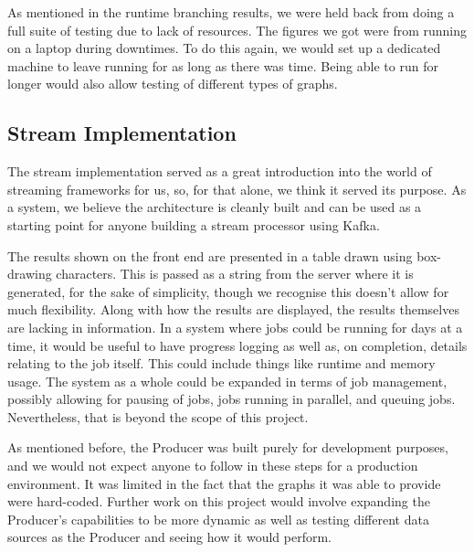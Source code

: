 As mentioned in the runtime branching results, we were held back from doing a
full suite of testing due to lack of resources. The figures we got were from
running on a laptop during downtimes. To do this again, we would set up a
dedicated machine to leave running for as long as there was time. Being able to
run for longer would also allow testing of different types of graphs.

\subsection{Stream Implementation}

The stream implementation served as a great introduction into the world of
streaming frameworks for us, so, for that alone, we think it served its
purpose. As a system, we believe the architecture is cleanly built and can be
used as a starting point for anyone building a stream processor using Kafka.

The results shown on the front end are presented in a table drawn using
box-drawing characters. This is passed as a string from the server where it is
generated, for the sake of simplicity, though we recognise this doesn't allow
for much flexibility. Along with how the results are displayed, the results
themselves are lacking in information. In a system where jobs could be running
for days at a time, it would be useful to have progress logging as well as, on
completion, details relating to the job itself. This could include things like
runtime and memory usage. The system as a whole could be expanded in terms of
job management, possibly allowing for pausing of jobs, jobs running in
parallel, and queuing jobs. Nevertheless, that is beyond the scope of this
project.

As mentioned before, the Producer was built purely for development purposes,
and we would not expect anyone to follow in these steps for a production
environment. It was limited in the fact that the graphs it was able to provide
were hard-coded. Further work on this project would involve expanding the
Producer's capabilities to be more dynamic as well as testing different data
sources as the Producer and seeing how it would perform.

